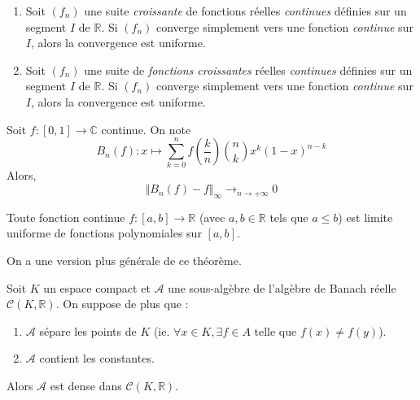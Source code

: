 
  \begin{theorem}
    \begin{enumerate}[label={\bfseries(\roman*)}]
      \item Soit $(f_n)$ une suite \textit{croissante} de fonctions réelles \textit{continues} définies sur un segment $I$ de $\mathbb{R}$. Si $(f_n)$ converge simplement vers une fonction \textit{continue} sur $I$, alors la convergence est uniforme.
      \item Soit $(f_n)$ une suite de \textit{fonctions croissantes} réelles \textit{continues} définies sur un segment $I$ de $\mathbb{R}$. Si $(f_n)$ converge simplement vers une fonction \textit{continue} sur $I$, alors la convergence est uniforme.
    \end{enumerate}
  \end{theorem}


  \begin{theorem}
    Soit $f : [0,1] \rightarrow \mathbb{C}$ continue. On note
    \[ B_n(f) : x \mapsto \sum_{k=0}^{n} f\left(\frac{k}{n}\right) \binom{n}{k} x^k (1-x)^{n-k} \]
    Alors,
    \[ \Vert B_n(f) - f \Vert_\infty \longrightarrow_{n \rightarrow +\infty} 0 \]
  \end{theorem}


  \begin{corollary}
    Toute fonction continue $f : [a,b] \rightarrow \mathbb{R}$ (avec $a, b \in \mathbb{R}$ tels que $a \leq b$) est limite uniforme de fonctions polynomiales sur $[a, b]$.
  \end{corollary}

  On a une version plus générale de ce théorème.


  \begin{theorem}
    Soit $K$ un espace compact et $\mathcal{A}$ une sous-algèbre de l'algèbre de Banach réelle $\mathcal{C}(K, \mathbb{R})$. On suppose de plus que :
    \begin{enumerate}[label={\bfseries(\roman*)}]
      \item $\mathcal{A}$ sépare les points de $K$ (ie. $\forall x \in K, \exists f \in A \text{ telle que } f(x) \neq f(y)$).
      \item $\mathcal{A}$ contient les constantes.
    \end{enumerate}
    Alors $\mathcal{A}$ est dense dans $\mathcal{C}(K, \mathbb{R})$.
  \end{theorem}

